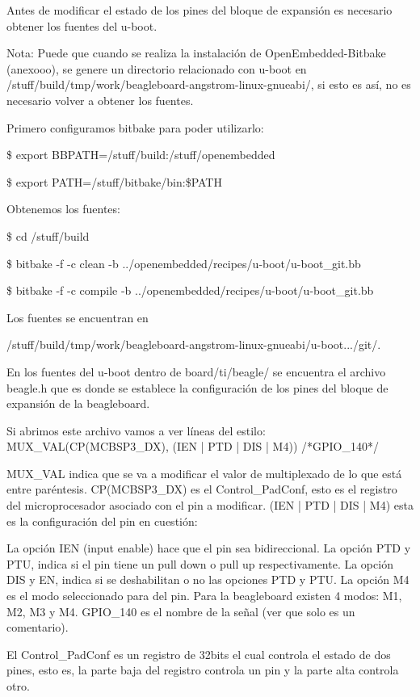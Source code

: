 Antes de modificar el estado de los pines del bloque de expansión es necesario obtener los fuentes del u-boot.

Nota: Puede que cuando se realiza la instalación de OpenEmbedded-Bitbake (anexooo), se genere un directorio relacionado con u-boot en /stuff/build/tmp/work/beagleboard-angstrom-linux-gnueabi/, si esto es así, no es necesario volver a obtener los fuentes.

Primero configuramos bitbake para poder utilizarlo:

\$ export BBPATH=/stuff/build:/stuff/openembedded

\$ export PATH=/stuff/bitbake/bin:\$PATH

Obtenemos los fuentes:

\$ cd /stuff/build

\$ bitbake -f -c clean -b ../openembedded/recipes/u-boot/u-boot\_git.bb

\$ bitbake -f -c compile -b ../openembedded/recipes/u-boot/u-boot\_git.bb

Los fuentes se encuentran en 

/stuff/build/tmp/work/beagleboard-angstrom-linux-gnueabi/u-boot.../git/.

En los fuentes del u-boot dentro de board/ti/beagle/ se encuentra el archivo beagle.h que es donde se establece la configuración de los pines del bloque de expansión de la beagleboard.

Si abrimos este archivo vamos a ver líneas del estilo: 
MUX\_VAL(CP(MCBSP3\_DX), (IEN | PTD | DIS | M4)) /*GPIO\_140*/\ 

MUX\_VAL indica que se va a modificar el valor de multiplexado de lo que está entre paréntesis. 
CP(MCBSP3\_DX) es el Control\_PadConf, esto es el registro del microprocesador asociado con el 
pin a modificar. 
(IEN | PTD | DIS | M4) esta es la configuración del pin en cuestión: 

La opción IEN (input enable) hace que el pin sea bidireccional. 
La opción PTD y PTU, indica si el pin tiene un pull down o pull up respectivamente. 
La opción DIS y EN, indica si se deshabilitan o no las opciones PTD y PTU. 
La opción M4 es el modo seleccionado para del pin. Para la beagleboard existen 4 modos: M1, M2, M3 y M4.
GPIO\_140 es el nombre de la señal (ver que solo es un comentario). 

El Control\_PadConf es un registro de 32bits el cual controla el estado de dos pines, esto es, la parte 
baja del registro controla un pin y la parte alta controla otro. 

